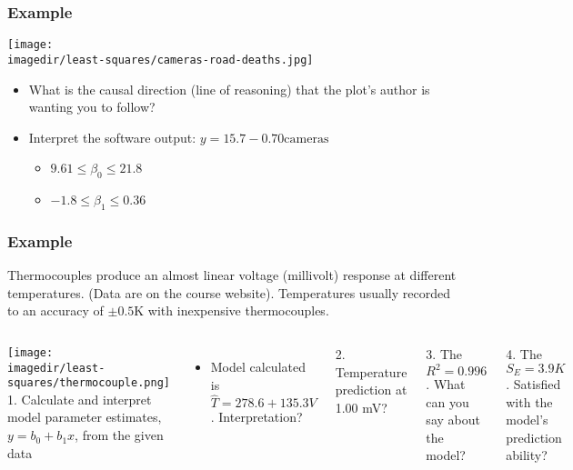 \begin{frame}\frametitle{Example}
	\begin{center}
		\texttt{[image: \\imagedir/least-squares/cameras-road-deaths.jpg]}
	\end{center}
	\begin{itemize}
		\item	What is the causal direction (line of reasoning) that the plot's author is wanting you to follow? 
		\item	Interpret the software output: $y = 15.7 - 0.70 \text{cameras}$ 
		\begin{itemize}
			\item	$9.61 \leq \beta_0 \leq 21.8$ 
			\item	$-1.8 \leq \beta_1 \leq 0.36$ 
		\end{itemize}
	\end{itemize}
\end{frame}

\begin{frame}\frametitle{Example}
	
	Thermocouples produce an almost linear voltage (millivolt) response at different temperatures. (Data are on the course website). Temperatures usually recorded to an accuracy of $\pm 0.5$K with inexpensive thermocouples.
	\begin{columns}
		\column{5cm} 
		\texttt{[image: \\imagedir/least-squares/thermocouple.png]} \column{5cm} 1. Calculate and interpret model parameter estimates, $y = b_0 + b_1 x$, from the given data
		\begin{itemize}
			\item	Model calculated is $\hat{T} = 278.6 + 135.3 V$. Interpretation? 
		\end{itemize}
		
		2. Temperature prediction at 1.00 mV?
		
		3. The $R^2 = 0.996$. What can you say about the model?
		
		4. The $S_E = 3.9K$. Satisfied with the model's prediction ability? 
	\end{columns}
\end{frame}

